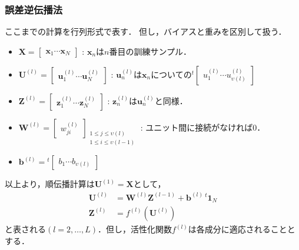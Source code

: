 \documentclass[dvipdfmx]{beamer}
\newcommand{\tp}{{}^t\!}
\renewcommand{\u}[2]{u_{#1}^{(#2)}}
\newcommand{\w}[2]{w_{#1}^{(#2)}}
\newcommand{\bu}[2]{\bm{u}_{#1}^{(#2)}}
\newcommand{\bz}[2]{\bm{z}_{#1}^{(#2)}}
\newcommand{\bup}[2]{\bm{#1}^{(#2)}}
\begin{document}
\begin{frame}
    \frametitle{誤差逆伝播法}
    ここまでの計算を行列形式で表す．
    但し，バイアスと重みを区別して扱う．
    \begin{itemize}
        \item $\bm{X} = \begin{bmatrix} \bm{x}_1 \cdots \bm{x}_N\end{bmatrix}$
        : $\bm{x}_n$は$n$番目の訓練サンプル．
        \item $\bup{U}{l} = \begin{bmatrix} \bu{1}{l} \cdots \bu{N}{l} \end{bmatrix}$
        : $\bu{n}{l}$は$\bm{x}_n$についての$\tp \begin{bmatrix}\u{1}{l} \cdots \u{\upsilon(l)}{l}\end{bmatrix}$
        \item $\bup{Z}{l} = \begin{bmatrix} \bz{1}{l} \cdots \bz{N}{l} \end{bmatrix}$
        : $\bz{n}{l}$は$\bu{n}{l}$と同様．
        \item $\bup{W}{l} = \begin{bmatrix} \w{ji}{l} \end{bmatrix}_{\substack{1 \leq j \leq \upsilon(l) \\ 1 \leq i \leq \upsilon(l-1)}}$
        : ユニット間に接続がなければ0．
        \item $\bup{b}{l} = \tp \begin{bmatrix} b_1 \cdots b_{\upsilon(l)} \end{bmatrix}$
    \end{itemize}
    以上より，順伝播計算は$\bup{U}{1} = \bm{X}$として，
    \begin{align}
        \bup{U}{l} &= \bup{W}{l} \bup{Z}{l-1} + \bup{b}{l} \, \tp\bm{1}_{N} \\
        \bup{Z}{l} &= f^{(l)}\left( \bup{U}{l} \right)
    \end{align}
    と表される$(l = 2, \ldots , L)$．但し，活性化関数$f^{(l)}$は各成分に適応されることとする．
\end{frame}
\end{document}
